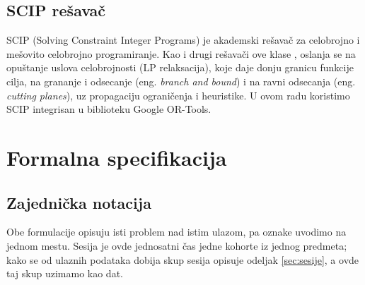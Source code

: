 \documentclass[12pt,oneside]{memoir}
\begin{document}
\subsection{SCIP rešavač}

SCIP (Solving Constraint Integer Programs) \cite{scip2009} je
akademski rešavač za celobrojno i mešovito celobrojno programiranje.
Kao i drugi rešavači ove klase \cite{wolsey1998}, oslanja se na
opuštanje uslova celobrojnosti (LP relaksacija), koje daje donju
granicu funkcije cilja, na grananje i odsecanje (eng. \emph{branch and
bound}) i na ravni odsecanja (eng. \emph{cutting planes}), uz
propagaciju ograničenja i heuristike. U ovom radu koristimo SCIP
integrisan u biblioteku Google OR-Tools.


\section{Formalna specifikacija}
\label{sec:formalna_specifikacija}

\subsection{Zajednička notacija}
\label{sec:notacija}

Obe formulacije opisuju isti problem nad istim ulazom, pa oznake
uvodimo na jednom mestu. Sesija je ovde jednosatni čas jedne kohorte
iz jednog predmeta; kako se od ulaznih podataka dobija skup sesija
opisuje odeljak \ref{sec:sesije}, a ovde taj skup uzimamo kao dat.
\end{document}
